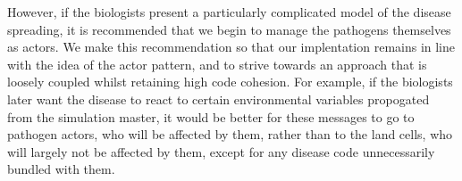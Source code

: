 \documentclass{article}
\begin{document}
However, if the biologists present a particularly complicated model of the disease spreading, it is recommended that we begin to manage the pathogens themselves as actors. We make this recommendation so that our implentation remains in line with the idea of the actor pattern, and to strive towards an approach that is loosely coupled whilst retaining high code cohesion. For example, if the biologists later want the disease to react to certain environmental variables propogated from the simulation master, it would be better for these messages to go to pathogen actors, who will be affected by them, rather than to the land cells, who will largely not be affected by them, except for any disease code unnecessarily bundled with them.
\end{document}

